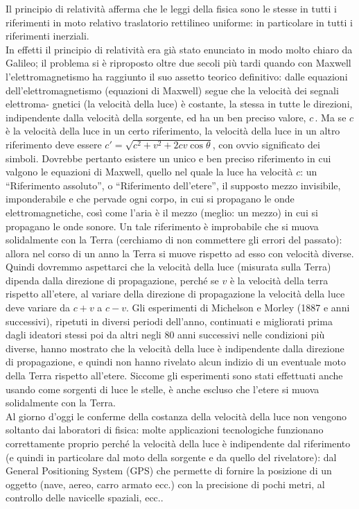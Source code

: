 Il principio di relativit\`a afferma che le leggi della fisica sono le stesse in
tutti i riferimenti in moto relativo traslatorio rettilineo uniforme: in
particolare in tutti i riferimenti inerziali.\\
In effetti il principio di relativit\`a era gi\`a stato enunciato in modo molto
chiaro da Galileo; il problema si \`e riproposto oltre due secoli pi\`u tardi
quando con Maxwell l'elettromagnetismo ha raggiunto il suo assetto teorico
definitivo: dalle equazioni dell'elettromagnetismo (equazioni di Maxwell) segue
che la velocit\`a dei segnali elettroma-
gnetici (la velocit\`a della luce) \`e costante, la stessa in tutte le
direzioni, indipendente dalla velocit\`a della sorgente, ed ha un ben preciso
valore, $c$\,. Ma se $c$ \`e la velocit\`a della luce in un certo riferimento,
la velocit\`a della luce in un altro riferimento deve essere
$c'=\sqrt{c^2+v^2+2cv\cos\theta}$, con ovvio significato dei simboli. Dovrebbe
pertanto esistere un unico e ben preciso riferimento in cui valgono le equazioni
di Maxwell, quello nel quale la luce ha velocit\`a $c$: un ``Riferimento
assoluto'', o ``Riferimento dell'etere'', il supposto mezzo invisibile,
imponderabile e che pervade ogni corpo, in cui si propagano le onde
elettromagnetiche, cos\`i come l'aria \`e il mezzo (meglio: un mezzo) in cui si
propagano le onde sonore. Un tale riferimento \`e improbabile che si muova
solidalmente con la Terra (cerchiamo di non commettere gli errori del passato):
allora nel corso di un anno la Terra si muove rispetto ad esso con velocit\`a
diverse. Quindi dovremmo aspettarci che la velocit\`a della luce (misurata sulla
Terra) dipenda dalla direzione di propagazione, perch\'e se $v$ \`e la
velocit\`a della terra rispetto all'etere, al variare della direzione di
propagazione la velocit\`a della luce deve variare da $c+v$ a $c-v$. Gli
esperimenti di Michelson e Morley (1887 e anni successivi), ripetuti in diversi
periodi dell'anno, continuati e migliorati prima dagli ideatori stessi poi da
altri negli 80 anni successivi nelle condizioni pi\`u diverse, hanno mostrato
che la velocit\`a della luce \`e indipendente dalla direzione di propagazione, e
quindi non hanno rivelato alcun indizio di un eventuale moto della Terra
rispetto all'etere. Siccome gli esperimenti sono stati effettuati anche usando
come sorgenti di luce le stelle, \`e anche escluso che l'etere si muova
solidalmente con la Terra.\\
Al giorno d'oggi le conferme della costanza della velocit\`a della luce non
vengono soltanto dai laboratori di fisica: molte applicazioni tecnologiche
funzionano correttamente proprio perch\'e la velocit\`a della luce \`e
indipendente dal riferimento (e quindi in particolare dal moto della sorgente e
da quello del rivelatore): dal General Positioning System (GPS) che permette di
fornire la posizione di un oggetto (nave, aereo, carro armato ecc.) con la
precisione di pochi metri, al controllo delle navicelle spaziali, ecc..

